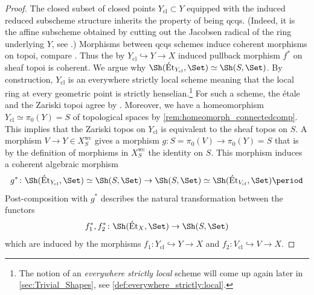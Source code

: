 \documentclass[leqno]{article}
\newcommand{\Et}[1]{\mathrm{\acute{E}t}_{#1}}
\begin{document}
\begin{proof}  
    The closed subset of closed points $Y_{\mathrm{cl}}\subset Y$ equipped with the induced reduced subscheme structure inherits the property of being qcqs. (Indeed, it is the affine subscheme obtained by cutting out the Jacobsen radical of the ring underlying $Y$, see \cite[Lemma 2.2.3]{MR3379634}.)
    Morphisms between qcqs schemes induce coherent morphisms on topoi, compare \cite[Example 2.22]{Haine:1-localic}.
    Thus the by $Y_{\mathrm{cl}}\hookrightarrow Y \rightarrow X$ induced pullback morphism $f^*$ on sheaf topoi is coherent.
    We argue why $\Sh(\Et{Y_{\mathrm{cl}}}, \Set)\simeq \Sh(S,\Set)$.
    By construction, $Y_{\mathrm{cl}}$ is an everywhere strictly local scheme meaning that the local ring at every geometric point is strictly henselian.\footnote{The notion of an \textit{everywhere strictly local} scheme will come up again later in \cref{sec:Trivial_Shapes}, see \cref{def:everywhere_strictly:local}.}
    For such a scheme, the \'{e}tale and the Zariski topoi agree by \cite[Corollary 2.5]{MR3649361}. Moreover, we have a homeomorphism $Y_{\mathrm{cl}}\simeq \pi_0(Y)=S$ of topological spaces by \cref{rem:homeomorph_connectedcomp}.
    This implies that the Zariski topos on $Y_{\mathrm{cl}}$ is equivalent to the sheaf topos on $S$.
    A morphism $V\rightarrow Y \in {X_{S}^{\mathrm{wc}}}$ gives a morphism $g\colon S=\pi_0(V) \rightarrow \pi_0(Y)=S$ that is by the definition of morphisms in ${X_{S}^{\mathrm{wc}}}$ the identity on $S$. This morphism induces a coherent algebraic morphism $$g^*\colon \Sh(\Et{Y_{\mathrm{cl}}}, \Set)\simeq \Sh(S,\Set)\rightarrow \Sh(S,\Set)\simeq \Sh(\Et{V_{\mathrm{cl}}}, \Set)\period $$  
    Post-composition with $g^*$ describes the natural transformation between the functors $$f_1^*,
    f_2^*\colon \Sh(\Et{X}, \Set)\rightarrow \Sh(S,\Set)$$ which are induced by the morphisms $f_1\colon Y_{\mathrm{cl}} \hookrightarrow Y \rightarrow X$ and $f_2 \colon V_{\mathrm{cl}} \hookrightarrow V \rightarrow X$.
\end{proof}
%
\end{document}
